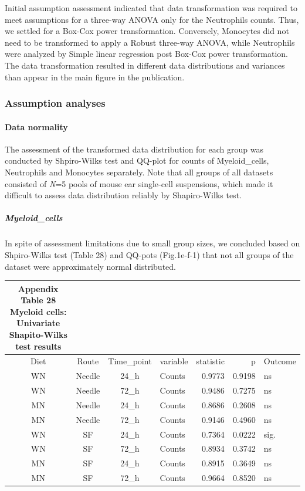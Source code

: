 \documentclass[
  12pt,
  letterpaper,
]{article}
\begin{document}
Initial assumption assessment indicated that data transformation was required to meet assumptions for a three-way ANOVA only for the Neutrophils counts. Thus, we settled for a Box-Cox power transformation. Conversely, Monocytes did not need to be transformed to apply a Robust three-way ANOVA, while Neutrophils were analyzed by Simple linear regression post Box-Cox power transformation. The data transformation resulted in different data distributions and variances than appear in the main figure in the publication.

\subsubsection{Assumption analyses}\label{assumption-analyses-1}

\paragraph{Data normality}\label{data-normality-1}

The assessment of the transformed data distribution for each group was conducted by Shpiro-Wilks test and QQ-plot for counts of Myeloid\_cells, Neutrophils and Monocytes separately. Note that all groups of all datasets consisted of \emph{N}=5 pools of mouse ear single-cell suspensions, which made it difficult to assess data distribution reliably by Shapiro-Wilks test.

\subparagraph{Myeloid\_cells}\label{myeloid_cells-2}

In spite of assessment limitations due to small group sizes, we concluded based on Shpiro-Wilks test (Table 28) and QQ-pots (Fig.1e-f-1) that not all groups of the dataset were approximately normal distributed.

\begin{longtable}{ccclrrl}
\caption*{
{\large \textbf{Appendix Table 28}} \\ 
{\small \textbf{Myeloid cells: Univariate Shapito-Wilks test results}}
} \\ 
\toprule
Diet & Route & Time\_point & variable & statistic & p & Outcome \\ 
\midrule\addlinespace[2.5pt]
WN & Needle & 24\_h & Counts & 0.9773 & 0.9198 & ns \\ 
WN & Needle & 72\_h & Counts & 0.9486 & 0.7275 & ns \\ 
MN & Needle & 24\_h & Counts & 0.8686 & 0.2608 & ns \\ 
MN & Needle & 72\_h & Counts & 0.9146 & 0.4960 & ns \\ 
WN & SF & 24\_h & Counts & 0.7364 & 0.0222 & sig. \\ 
WN & SF & 72\_h & Counts & 0.8934 & 0.3742 & ns \\ 
MN & SF & 24\_h & Counts & 0.8915 & 0.3649 & ns \\ 
MN & SF & 72\_h & Counts & 0.9664 & 0.8520 & ns \\ 
\bottomrule
\end{longtable}
\end{document}
